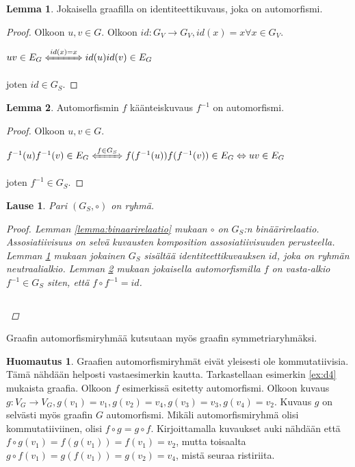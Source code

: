\documentclass[a4paper, 12pt]{article}
\theoremstyle{definition}
\newtheorem{huom}{Huomautus}
\newtheorem{lemma}{Lemma}
\theoremstyle{plain}
\newtheorem{teor}[mydef]{Lause}
\begin{document}
\begin{lemma}
\label{lemma:identiteetti}
Jokaisella graafilla on identiteettikuvaus, joka on automorfismi.
\begin{proof}
Olkoon $u, v \in G$. Olkoon $id: G_V \rightarrow G_V, id(x) = x \forall x \in G_V$.
\begin{center}
\begin{math}
uv \in E_G \xLeftrightarrow{id(x) = x} id(u)id(v) \in E_G  
\end{math}
\end{center}
joten $id \in G_S$.
\end{proof}
\end{lemma}

\begin{lemma}
\label{lemma:kaanteiskuvaus}
Automorfismin $f$ käänteiskuvaus $f^{-1}$ on automorfismi.
\begin{proof}
Olkoon $u, v \in G$.
\begin{center}
\begin{math}
f^{-1}(u)f^{-1}(v) \in E_G \xLeftrightarrow{f \in G_S} f(f^{-1}(u))f(f^{-1}(v)) \in E_G \Leftrightarrow uv \in E_G
\end{math}
\end{center}
joten $f^{-1} \in G_S$.
\end{proof}
\end{lemma}

\begin{teor}
Pari $(G_S, \circ)$ on ryhmä.
\begin{proof}
Lemman \ref{lemma:binaarirelaatio} mukaan $\circ$ on $G_S$:n binäärirelaatio. Assosiatiivisuus on selvä kuvausten komposition assosiatiivisuuden perusteella. Lemman \ref{lemma:identiteetti} mukaan jokainen $G_S$ sisältää identiteettikuvauksen $id$, joka on ryhmän neutraalialkio. Lemman \ref{lemma:kaanteiskuvaus} mukaan jokaisella automorfismilla $f$ on vasta-alkio $f^{-1} \in G_S$ siten, että $f \circ f^{-1} = id$.
\begin{center}
\begin{math}
\end{math}
\end{center}
\end{proof}
\end{teor}

Graafin automorfismiryhmää kutsutaan myös graafin symmetriaryhmäksi.

\begin{huom}
Graafien automorfismiryhmät eivät yleisesti ole kommutatiivisia.\\
Tämä nähdään helposti vastaesimerkin kautta. Tarkastellaan esimerkin \ref{ex:d4} mukaista graafia. Olkoon $f$ esimerkissä esitetty automorfismi. Olkoon kuvaus $g: V_G \rightarrow V_G, g(v_1) = v_1, g(v_2) = v_4, g(v_3) = v_3, g(v_4) = v_2$. Kuvaus $g$ on selvästi myös graafin $G$ automorfismi. Mikäli automorfismiryhmä olisi kommutatiiviinen, olisi $f \circ g = g \circ f$. Kirjoittamalla kuvaukset auki nähdään että $f \circ g(v_1) = f(g(v_1)) = f(v_1) = v_2$, mutta toisaalta $g \circ f (v_1) = g(f(v_1)) = g(v_2) = v_4$, mistä seuraa ristiriita.
\end{huom}
\end{document}
